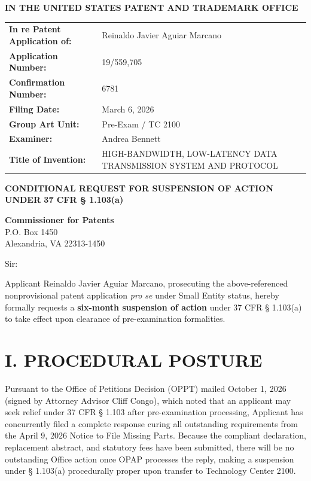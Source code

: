 \documentclass[11pt,letterpaper]{article}
\begin{document}
\thispagestyle{empty}

\begin{center}
    \large\textbf{IN THE UNITED STATES PATENT AND TRADEMARK OFFICE} \\
\end{center}

\vspace{0.2cm}
\noindent\begin{tabular}{p{2.3in}p{4.0in}}
\textbf{In re Patent Application of:} & Reinaldo Javier Aguiar Marcano \\
\textbf{Application Number:} & 19/559,705 \\
\textbf{Confirmation Number:} & 6781 \\
\textbf{Filing Date:} & March 6, 2026 \\
\textbf{Group Art Unit:} & Pre-Exam / TC 2100 \\
\textbf{Examiner:} & Andrea Bennett \\
\textbf{Title of Invention:} & HIGH-BANDWIDTH, LOW-LATENCY DATA TRANSMISSION SYSTEM AND PROTOCOL \\
\end{tabular}

\vspace{0.4cm}
\begin{center}
    \textbf{\large CONDITIONAL REQUEST FOR SUSPENSION OF ACTION \\
    UNDER 37 CFR \S{} 1.103(a)}
\end{center}

\vspace{0.2cm}
\noindent\textbf{Commissioner for Patents} \\
\noindent P.O. Box 1450 \\
\noindent Alexandria, VA 22313-1450

\vspace{0.2cm}
\noindent Sir:

Applicant Reinaldo Javier Aguiar Marcano, prosecuting the above-referenced nonprovisional patent application \textit{pro se} under Small Entity status, hereby formally requests a \textbf{six-month suspension of action} under 37 CFR \S{} 1.103(a) to take effect upon clearance of pre-examination formalities.

\section*{I. PROCEDURAL POSTURE}

Pursuant to the Office of Petitions Decision (OPPT) mailed October 1, 2026 (signed by Attorney Advisor Cliff Congo), which noted that an applicant may seek relief under 37 CFR \S{} 1.103 after pre-examination processing, Applicant has concurrently filed a complete response curing all outstanding requirements from the April 9, 2026 Notice to File Missing Parts. Because the compliant declaration, replacement abstract, and statutory fees have been submitted, there will be no outstanding Office action once OPAP processes the reply, making a suspension under \S{} 1.103(a) procedurally proper upon transfer to Technology Center 2100.
\end{document}
